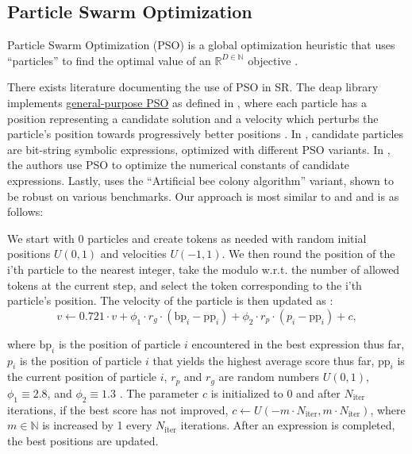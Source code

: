 \documentclass[runningheads]{llncs}
\begin{document}
\subsection{Particle Swarm Optimization} \label{subsec:ParticleSwarmOptimization}
Particle Swarm Optimization (PSO) is a global optimization heuristic that uses ``particles'' to find the optimal value of an $\mathbb{R}^{D\in\mathbb{N}}$ objective  \cite{clerc:hal-00764996}.
\par There exists literature documenting the use of PSO in SR. The deap library implements \href{https://github.com/DEAP/deap/blob/60913c5543abf8318ddce0492e8ffcdf37974d86/examples/pso/basic.py}{general-purpose PSO} as defined in \cite{PoliOverviewPSO}, where each particle has a position representing a candidate solution and a velocity which perturbs the particle's position towards progressively better positions \cite{DEAP_JMLR2012}. In \cite{10.1007/978-3-319-70093-9_37}, candidate particles are bit-string symbolic expressions, optimized with different PSO variants. In \cite{Lu2021}, the authors use PSO to optimize the numerical constants of candidate expressions. Lastly, \cite{KARABOGA20121} uses the ``Artificial bee colony algorithm'' variant, shown to be robust on various benchmarks. Our approach is most similar to \cite{DEAP_JMLR2012} and \cite{10.1007/978-3-319-70093-9_37} and is as follows:
\par We start with 0 particles and create tokens as needed with random initial positions $U(0,1)$ and velocities $U(-1,1)$. We then round the position of the i'th particle to the nearest integer, take the modulo w.r.t. the number of allowed tokens at the current step, and select the token corresponding to the i'th particle's position. The velocity of the particle is then updated as \cite{clerc:hal-00764996} \cite{offShellPSO}:
\begin{equation}
		v \gets 0.721\cdot v + \phi_1 \cdot r_g \cdot (\mathrm{bp}_i - \mathrm{pp}_i) + \phi_2\cdot r_p \cdot (p_i - \mathrm{pp}_i) + c,
\end{equation}

where $\mathrm{bp}_i$ is the position of particle $i$ encountered in the best expression thus far, $p_i$ is the position of particle $i$ that yields the highest average score thus far, $\mathrm{pp}_i$ is the current position of particle $i$, $r_p$ and $r_g$ are random numbers $U(0,1)$, $\phi_1 \equiv 2.8$, and $\phi_2 \equiv 1.3$  \cite{offShellPSO}. The parameter $c$ is initialized to 0 and after $N_{\mathrm{iter}}$ iterations, if the best score has not improved, $c \gets U(-m\cdot N_{\mathrm{iter}}, m\cdot N_{\mathrm{iter}})$, where $m \in \mathbb{N}$ is increased by 1 every $N_{\mathrm{iter}}$ iterations. After an expression is completed, the best positions are updated. 
\end{document}
